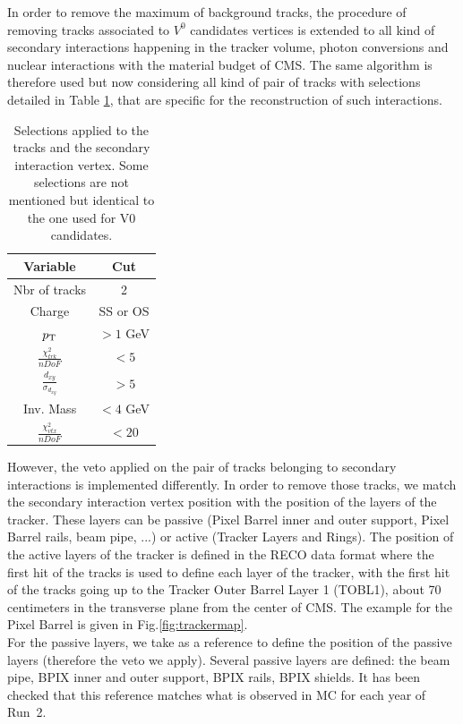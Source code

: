 \documentclass{cernatlasnote}
\newcommand{\pt}{$p_{\text T}$\xspace}
\begin{document}
In order to remove the maximum of background tracks, the procedure of removing tracks associated to $V^0$ candidates vertices is extended to all kind of secondary interactions happening in the tracker volume, photon conversions and nuclear interactions with the material budget of CMS. The same algorithm is therefore used but now considering all kind of pair of tracks with selections detailed in Table \ref{tab:SECINTSEL}, that are specific for the reconstruction of such interactions.\\

\begin{table}
\centering
    \begin{tabular}{|c|c|}
    \hline
    \rowcolor{lightgray} 
           Variable  &  Cut\\
            \hline
            Nbr of tracks & 2 \\
            \hline
              Charge & SS or OS\\
             \hline
            \pt & $>1$ GeV\\
            \hline
            $\frac{\chi^{2}_{trk}}{nDoF}$  & $<5$\\
            \hline
            $\frac{d_{xy}}{\sigma_{d_{xy}}}$ & $>5$\\
            \hline
             Inv. Mass & $<4$ GeV\\
            \hline
              $\frac{\chi^{2}_{vtx}}{nDoF}$ & $<20$\\
             \hline
    \end{tabular}
    \caption{Selections applied to the tracks and the secondary interaction vertex. Some selections are not mentioned but identical to the one used for V0 candidates.}
    \label{tab:SECINTSEL}
\end{table}

However, the veto applied on the pair of tracks belonging to secondary interactions is implemented differently.  In order to remove those tracks, we match the secondary interaction vertex position with the position of the layers of the tracker. These layers can be passive (Pixel Barrel inner and outer support, Pixel Barrel rails, beam pipe, ...) or active (Tracker Layers and Rings). The position of the active layers of the tracker is defined in the RECO data format where the first hit of the tracks is used to define each layer of the tracker, with the first hit of the tracks going up to the Tracker Outer Barrel Layer 1 (TOBL1), about 70 centimeters in the transverse plane from the center of CMS. The example for the Pixel Barrel is given in Fig.\ref{fig:trackermap}.\\
For the passive layers, we take as a reference \cite{Sirunyan_2018} to define the position of the passive layers (therefore the veto we apply). Several passive layers are defined: the beam pipe, BPIX inner and outer support, BPIX rails, BPIX shields. It has been checked that this reference matches what is observed in MC for each year of Run~2.\\
\end{document}
